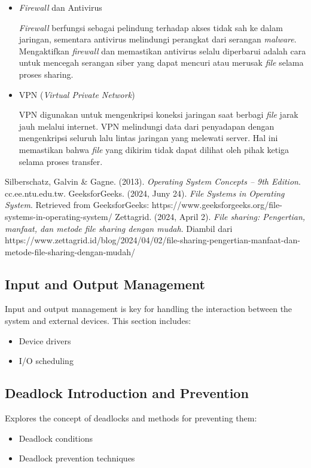 \documentclass[12pt]{article}
\begin{document}
\begin{itemize}
\begin{itemize}
        \item \textit{Firewall} dan Antivirus

        \textit{Firewall} berfungsi sebagai pelindung terhadap akses tidak sah ke dalam jaringan, sementara antivirus melindungi perangkat dari serangan \textit{malware}. Mengaktifkan \textit{firewall} dan memastikan antivirus selalu diperbarui adalah cara untuk mencegah serangan siber yang dapat mencuri atau merusak \textit{file }selama proses sharing.

        \item VPN (\textit{Virtual Private Network})

        VPN digunakan untuk mengenkripsi koneksi jaringan saat berbagi \textit{file }jarak jauh melalui internet. VPN melindungi data dari penyadapan dengan mengenkripsi seluruh lalu lintas jaringan yang melewati server. Hal ini memastikan bahwa \textit{file} yang dikirim tidak dapat dilihat oleh pihak ketiga selama proses transfer.
    \end{itemize}
\end{itemize}

\begin{thebibliography}{99}
        Silberschatz, Galvin \& Gagne. (2013). \textit{Operating System Concepts – 9th Edition}. cc.ee.ntu.edu.tw.
        GeeksforGeeks. (2024, Juny 24). \textit{File Systems in Operating System}. Retrieved from GeeksforGeeks: https://www.geeksforgeeks.org/file-systems-in-operating-system/
        Zettagrid. (2024, April 2). \textit{File sharing: Pengertian, manfaat, dan metode file sharing dengan mudah}. Diambil dari https://www.zettagrid.id/blog/2024/04/02/file-sharing-pengertian-manfaat-dan-metode-file-sharing-dengan-mudah/
    \end{thebibliography}


\subsection{Input and Output Management}
Input and output management is key for handling the interaction between the system and external devices. This section includes:
\begin{itemize}
    \item Device drivers
    \item I/O scheduling
\end{itemize}

\subsection{Deadlock Introduction and Prevention}
Explores the concept of deadlocks and methods for preventing them:
\begin{itemize}
    \item Deadlock conditions
    \item Deadlock prevention techniques
\end{itemize}
\end{document}
